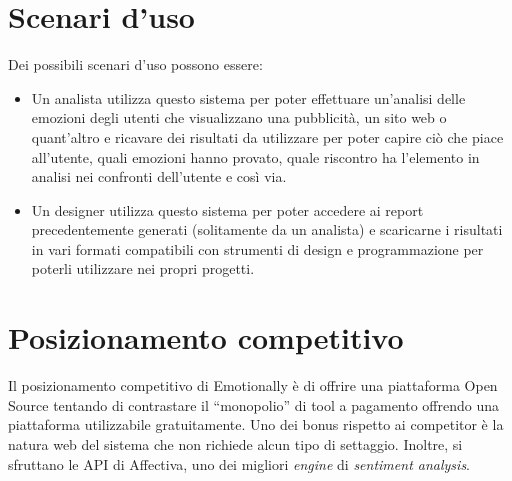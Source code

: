 \section{Scenari d'uso}\label{sec:scenari-duso}
Dei possibili scenari d'uso possono essere:
\begin{itemize}
	\item Un analista utilizza questo sistema per poter effettuare un'analisi 
	delle emozioni degli utenti che visualizzano una pubblicità, un sito web o 
	quant'altro e ricavare dei risultati da utilizzare per poter capire ciò che 
	piace all'utente, quali emozioni hanno provato, quale riscontro ha 
	l'elemento in analisi nei confronti dell'utente e così via.
	\item Un designer utilizza questo sistema per poter accedere ai report 
	precedentemente generati (solitamente da un analista) e scaricarne i 
	risultati in vari formati compatibili con strumenti di design e 
	programmazione per poterli utilizzare nei propri progetti.
\end{itemize}

\section{Posizionamento competitivo}\label{sec:posizionamento-competitivo}

Il posizionamento competitivo di Emotionally è di offrire una piattaforma Open 
Source tentando di contrastare il ``monopolio'' di tool a pagamento offrendo 
una piattaforma utilizzabile gratuitamente. Uno dei bonus rispetto ai 
competitor è la natura web del sistema che non richiede alcun tipo di 
settaggio. Inoltre, si sfruttano le API di Affectiva, uno dei migliori 
\textit{engine} di \textit{sentiment analysis}.